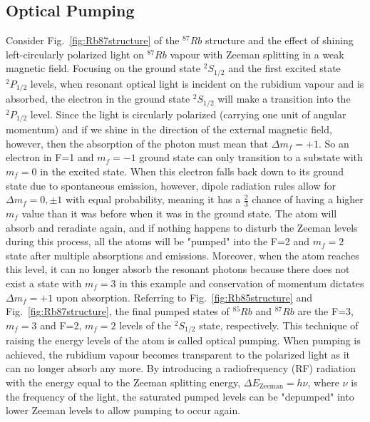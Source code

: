 \documentclass[%
 aip,
rsi,%
 amsmath,amssymb,
 reprint,%
author-numerical,%
]{revtex4-1}
\begin{document}
\subsection{Optical Pumping}
Consider Fig.~\ref{fig:Rb87structure} of the $^{87}Rb$ structure and the effect of shining left-circularly polarized light on $^{87}Rb$ vapour with Zeeman splitting in a weak magnetic field. Focusing on the ground state $^{2} S _ { 1 / 2 }$ and the first excited state $^{2} P _ { 1 / 2 }$ levels, when resonant optical light is incident on the rubidium vapour and is absorbed, the electron in the ground state $^{2} S _ { 1 / 2 }$ will make a transition into the $^{2} P _ { 1 / 2 }$ level. Since the light is circularly polarized (carrying one unit of angular momentum) and if we shine in the direction of the external magnetic field, however, then the absorption of the photon must mean that $\Delta m_{f}=+1$. So an electron in F=1 and $m_{f}=-1$ ground state can only transition to a substate with $m_{f}=0$ in the excited state.\cite{Zafra} \newline
\indent When this electron falls back down to its ground state due to spontaneous emission, however, dipole radiation rules allow for $\Delta m_{f}=0, \pm1$ with equal probability, meaning it has a $\frac{2}{3}$ chance of having a higher $m_{f}$ value than it was before when it was in the ground state. The atom will absorb and reradiate again, and if nothing happens to disturb the Zeeman levels during this process, all the atoms will be "pumped" into the F=2 and  $m_{f}=2$ state after multiple absorptions and emissions. Moreover, when the atom reaches this level, it can no longer absorb the resonant photons because there does not exist a state with $m_{f}=3$ in this example and conservation of momentum dictates $\Delta m_{f}=+1$ upon absorption.  Referring to Fig.~\ref{fig:Rb85structure} and Fig.~\ref{fig:Rb87structure}, the final pumped states of  $^{85}Rb$ and $^{87}Rb$ are the F=3, $m_{f}=3$ and F=2, $m_{f}=2$ levels of the $^{2} S _ { 1 / 2 }$ state, respectively.  This technique of raising the energy levels of the atom is called optical pumping. \newline
\indent When pumping is achieved, the rubidium vapour becomes transparent to the polarized light as it can no longer absorb any more. By introducing a radiofrequency (RF) radiation with the energy equal to the Zeeman splitting energy, $\Delta E _ { \mathrm { Zeeman } }=h\nu$, where $\nu$ is the frequency of the light, the saturated pumped levels can be "depumped" into lower Zeeman levels to allow pumping to occur again.
\end{document}
